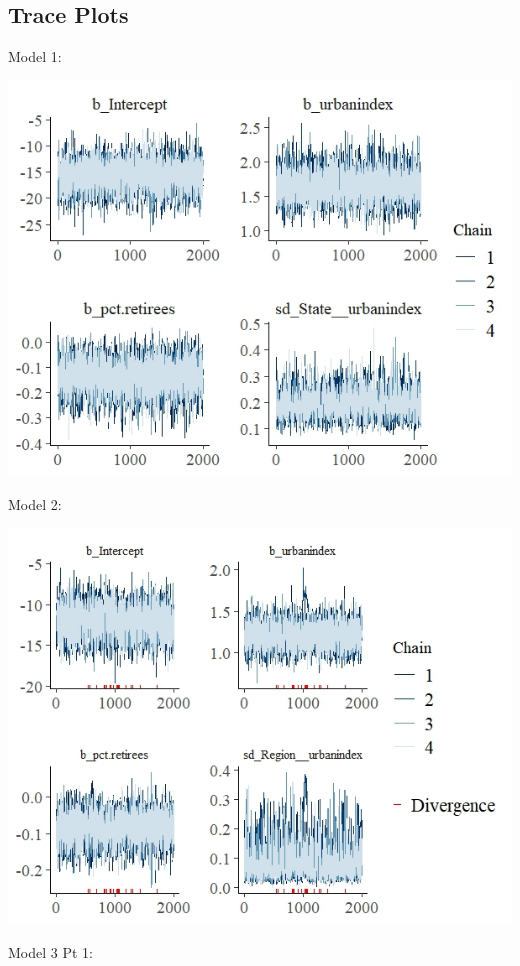 \documentclass[12pt]{article}
\begin{document}
\subsection*{Trace Plots}

Model 1:

\includegraphics[scale = 1.25]{trace_plots/trace_model1.jpeg}

Model 2:

\includegraphics[scale = 1.4]{trace_plots/trace_model2.jpeg}

Model 3 Pt 1:
\end{document}
